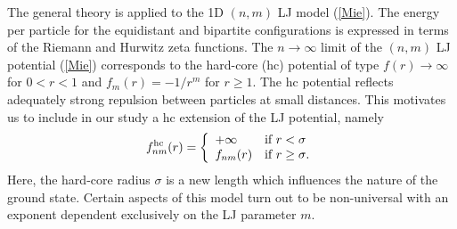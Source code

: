 \documentclass[12pt]{iopart}
\theoremstyle{definition}
\begin{document}
The general theory is applied to the 1D $(n,m)$ LJ model (\ref{Mie}).
The energy per particle for the equidistant and bipartite configurations
is expressed in terms of the Riemann and Hurwitz zeta functions.
The $n\to\infty$ limit of the $(n,m)$ LJ potential (\ref{Mie})  
corresponds to the hard-core (hc) potential of type $f(r)\to\infty$
for $0<r<1$ and $f_m(r) = -1/r^m$ for $r\ge 1$.
The hc potential reflects adequately strong repulsion between particles
at small distances.
This motivates us to include in our study a hc extension of the LJ potential,
namely
\begin{equation} \label{fhc}
f_{nm}^{\rm hc}(r) = \left\{
\begin{array}{ll}
+\infty & \mbox{if $r<\sigma$} \cr
f_{nm}(r) & \mbox{if $r\ge \sigma$.}
\end{array}  
\right.  
\end{equation}
Here, the hard-core radius $\sigma$ is a new length which influences the nature
of the ground state.
Certain aspects of this model turn out to be non-universal with
an exponent dependent exclusively on the LJ parameter $m$.

\medskip
\end{document}
